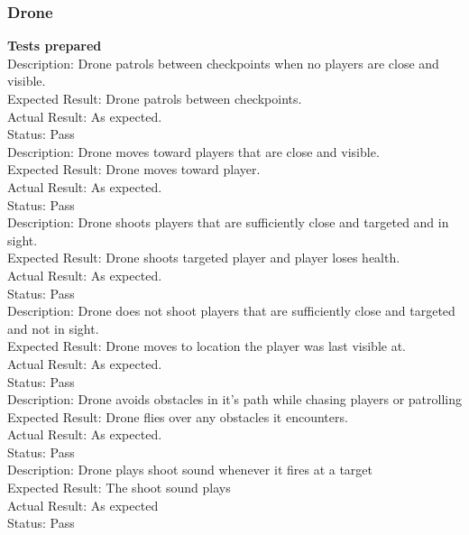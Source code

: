 \documentclass[11pt,a4paper]{article}
\begin{document}
\subsubsection{Drone}
\textbf{Tests prepared}\\
Description: Drone patrols between checkpoints when no players are close and visible.\\
Expected Result: Drone patrols between checkpoints.\\
Actual Result: As expected.\\
Status: Pass
\smallskip\\
Description: Drone moves toward players that are close and visible.\\
Expected Result: Drone moves toward player.\\
Actual Result: As expected.\\
Status: Pass
\smallskip\\
Description: Drone shoots players that are sufficiently close and targeted and in sight.\\
Expected Result: Drone shoots targeted player and player loses health.\\
Actual Result: As expected.\\
Status: Pass
\smallskip\\
Description: Drone does not shoot players that are sufficiently close and targeted and not in sight.\\
Expected Result: Drone moves to location the player was last visible at.\\
Actual Result: As expected.\\
Status: Pass
\smallskip\\
Description: Drone avoids obstacles in it's path while chasing players or patrolling\\
Expected Result: Drone flies over any obstacles it encounters.\\
Actual Result: As expected.\\
Status: Pass
\smallskip\\
Description: Drone plays shoot sound whenever it fires at a target\\
Expected Result: The shoot sound plays\\
Actual Result:  As expected\\
Status: Pass
\end{document}
